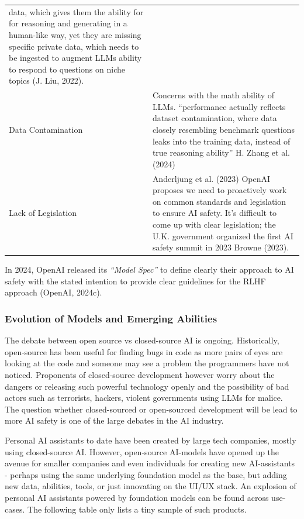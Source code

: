 \documentclass[
  letterpaper,
  DIV=11,
  numbers=noendperiod]{scrartcl}
\begin{document}
\begin{longtable}[]{@{}
  >{\raggedright\arraybackslash}p{}
  >{\raggedright\arraybackslash}p{}@{}}
data, which gives them the ability for for reasoning and generating in a
human-like way, yet they are missing specific private data, which needs
to be ingested to augment LLMs ability to respond to questions on niche
topics (J. Liu, 2022). \\
Data Contamination & Concerns with the math ability of LLMs.
``performance actually reflects dataset contamination, where data
closely resembling benchmark questions leaks into the training data,
instead of true reasoning ability'' H. Zhang et al. (2024) \\
Lack of Legislation & Anderljung et al. (2023) OpenAI proposes we need
to proactively work on common standards and legislation to ensure AI
safety. It's difficult to come up with clear legislation; the U.K.
government organized the first AI safety summit in 2023 Browne
(2023). \\
\end{longtable}

In 2024, OpenAI released its \emph{``Model Spec''} to define clearly
their approach to AI safety with the stated intention to provide clear
guidelines for the RLHF approach (OpenAI, 2024c).

\subsubsection{Evolution of Models and Emerging
Abilities}\label{evolution-of-models-and-emerging-abilities}

The debate between open source vs closed-source AI is ongoing.
Historically, open-source has been useful for finding bugs in code as
more pairs of eyes are looking at the code and someone may see a problem
the programmers have not noticed. Proponents of closed-source
development however worry about the dangers or releasing such powerful
technology openly and the possibility of bad actors such as terrorists,
hackers, violent governments using LLMs for malice. The question whether
closed-sourced or open-sourced development will be lead to more AI
safety is one of the large debates in the AI industry.

Personal AI assistants to date have been created by large tech
companies, mostly using closed-source AI. However, open-source AI-models
have opened up the avenue for smaller companies and even individuals for
creating new AI-assistants - perhaps using the same underlying
foundation model as the base, but adding new data, abilities, tools, or
just innovating on the UI/UX stack. An explosion of personal AI
assistants powered by foundation models can be found across use-cases.
The following table only lists a tiny sample of such products.
\end{document}
